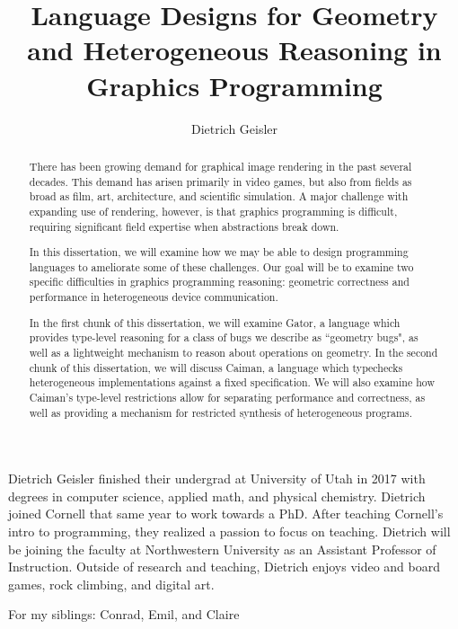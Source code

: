 \documentclass[phd,tocprelim]{cornell}
\title {Language Designs for Geometry and Heterogeneous Reasoning in Graphics Programming}
\author {Dietrich Geisler}
\begin{document}
\maketitle
\makecopyright

\mathligson

\begin{abstract}
There has been growing demand for graphical image rendering in the past several decades.  This demand has arisen primarily in video games, but also from fields as broad as film, art, architecture, and scientific simulation.  A major challenge with expanding use of rendering, however, is that graphics programming is difficult, requiring significant field expertise when abstractions break down.

In this dissertation, we will examine how we may be able to design programming languages to ameliorate some of these challenges.  Our goal will be to examine two specific difficulties in graphics programming reasoning: geometric correctness and performance in heterogeneous device communication.  

In the first chunk of this dissertation, we will examine Gator, a language which provides type-level reasoning for a class of bugs we describe as ``geometry bugs", as well as a lightweight mechanism to reason about operations on geometry.  In the second chunk of this dissertation, we will discuss Caiman, a language which typechecks heterogeneous implementations against a fixed specification.  We will also examine how Caiman's type-level restrictions allow for separating performance and correctness, as well as providing a mechanism for restricted synthesis of heterogeneous programs.
\end{abstract}

\begin{biosketch}
Dietrich Geisler finished their undergrad at University of Utah in 2017 with degrees in computer science, applied math, and physical chemistry.  
Dietrich joined Cornell that same year to work towards a PhD.
After teaching Cornell's intro to programming, they realized a passion to focus on teaching.
Dietrich will be joining the faculty at Northwestern University as an Assistant Professor of Instruction.
Outside of research and teaching, Dietrich enjoys video and board games, rock climbing, and digital art.

\end{biosketch}

\begin{dedication}
For my siblings: Conrad, Emil, and Claire
\end{dedication}
\end{document}

